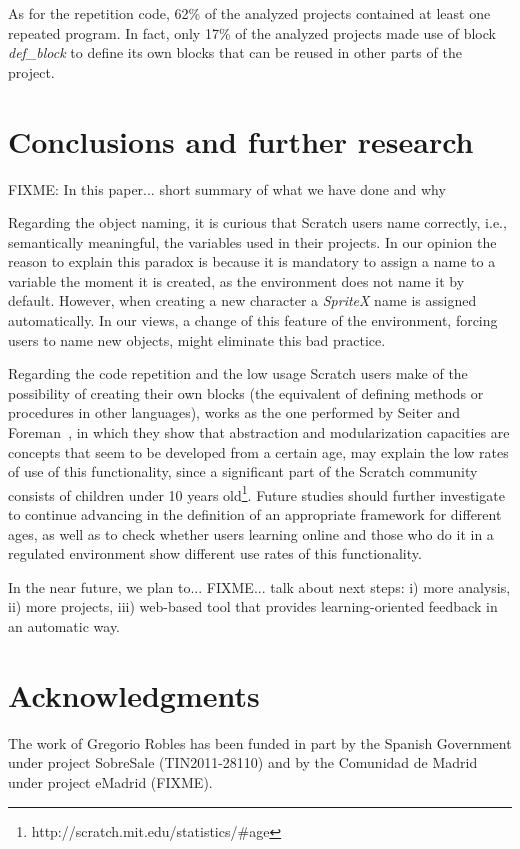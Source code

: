 \documentclass[conference]{format/IEEEtran}
\begin{document}
As for the repetition code, 62\% of the analyzed projects contained at least one repeated program. In fact, only 17\% of the analyzed projects made use of block \textit{def\_block} to define its own blocks that can be reused in other parts of the project. 

\section{Conclusions and further research}
\label{sec:conclusions}

FIXME: In this paper... short summary of what we have done and why

Regarding the object naming, it is curious that Scratch users name correctly, i.e., semantically meaningful, the variables used in their projects. In our opinion the reason to explain this paradox is because it is mandatory to assign a name to a variable the moment it is created, as the environment does not name it by default. However, when creating a new character a  \textit{SpriteX} name is assigned automatically. In our views, a change of this feature of the environment, forcing users to name new objects, might eliminate this bad practice.

Regarding the code repetition and the low usage Scratch users make of the possibility of creating their own blocks (the equivalent of defining methods or procedures in other languages), works as the one performed by Seiter and Foreman~\cite {seiter2013modeling}, in which they show that abstraction and modularization capacities are concepts that seem to be developed from a certain age, may explain the low rates of use of this functionality, since a significant part of the Scratch community consists of children under 10 years old\footnote{http://scratch.mit.edu/statistics/\#age}. Future studies should further investigate to continue advancing in the definition of an appropriate framework for different ages, as well as to check whether users learning online and those who do it in a regulated environment show different use rates of this functionality.

In the near future, we plan to... FIXME... talk about next steps: i) more analysis, ii) more projects, iii) web-based tool that provides learning-oriented feedback in an automatic way.

\section*{Acknowledgments}

The work of Gregorio Robles has
been funded in part by the Spanish Government under project 
SobreSale (TIN2011-28110) and by the Comunidad de Madrid 
under project eMadrid (FIXME). 



\end{document}
